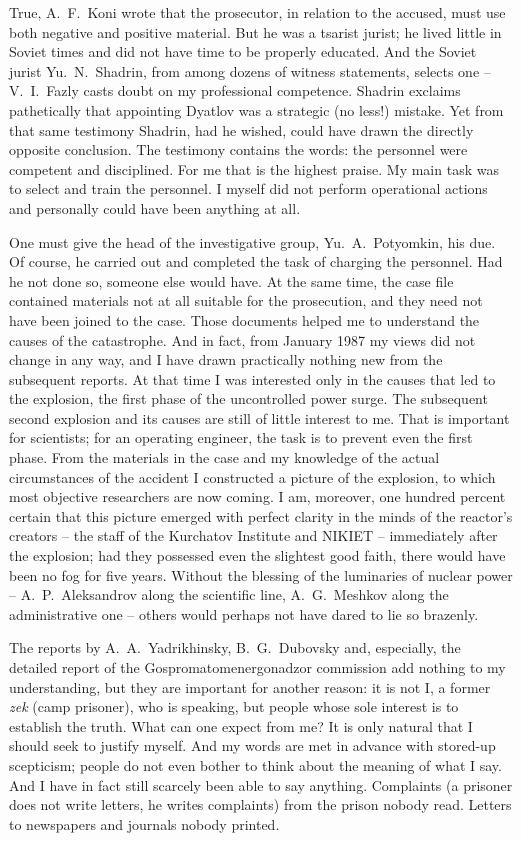 \documentclass[openright]{bookest}
\begin{document}
True, A.~F.~Koni wrote that the prosecutor, in relation to the accused, must use both negative and positive material. But he was a tsarist jurist; he lived little in Soviet times and did not have time to be properly educated. And the Soviet jurist Yu.~N.~Shadrin, from among dozens of witness statements, selects one -- V.~I.~Fazly casts doubt on my professional competence. Shadrin exclaims pathetically that appointing Dyatlov was a strategic (no less!) mistake. Yet from that same testimony Shadrin, had he wished, could have drawn the directly opposite conclusion. The testimony contains the words: the personnel were competent and disciplined. For me that is the highest praise. My main task was to select and train the personnel. I myself did not perform operational actions and personally could have been anything at all.

One must give the head of the investigative group, Yu.~A.~Potyomkin, his due. Of course, he carried out and completed the task of charging the personnel. Had he not done so, someone else would have. At the same time, the case file contained materials not at all suitable for the prosecution, and they need not have been joined to the case. Those documents helped me to understand the causes of the catastrophe. And in fact, from January 1987 my views did not change in any way, and I have drawn practically nothing new from the subsequent reports. At that time I was interested only in the causes that led to the explosion, the first phase of the uncontrolled power surge. The subsequent second explosion and its causes are still of little interest to me. That is important for scientists; for an operating engineer, the task is to prevent even the first phase. From the materials in the case and my knowledge of the actual circumstances of the accident I constructed a picture of the explosion, to which most objective researchers are now coming. I am, moreover, one hundred percent certain that this picture emerged with perfect clarity in the minds of the reactor's creators -- the staff of the Kurchatov Institute and NIKIET -- immediately after the explosion; had they possessed even the slightest good faith, there would have been no fog for five years. Without the blessing of the luminaries of nuclear power -- A.~P.~Aleksandrov along the scientific line, A.~G.~Meshkov along the administrative one -- others would perhaps not have dared to lie so brazenly.

The reports by A.~A.~Yadrikhinsky, B.~G.~Dubovsky and, especially, the detailed report of the Gospromatomenergonadzor commission add nothing to my understanding, but they are important for another reason: it is not I, a former \textit{zek} (camp prisoner), who is speaking, but people whose sole interest is to establish the truth. What can one expect from me? It is only natural that I should seek to justify myself. And my words are met in advance with stored-up scepticism; people do not even bother to think about the meaning of what I say. And I have in fact still scarcely been able to say anything. Complaints (a prisoner does not write letters, he writes complaints) from the prison nobody read. Letters to newspapers and journals nobody printed.
\end{document}
